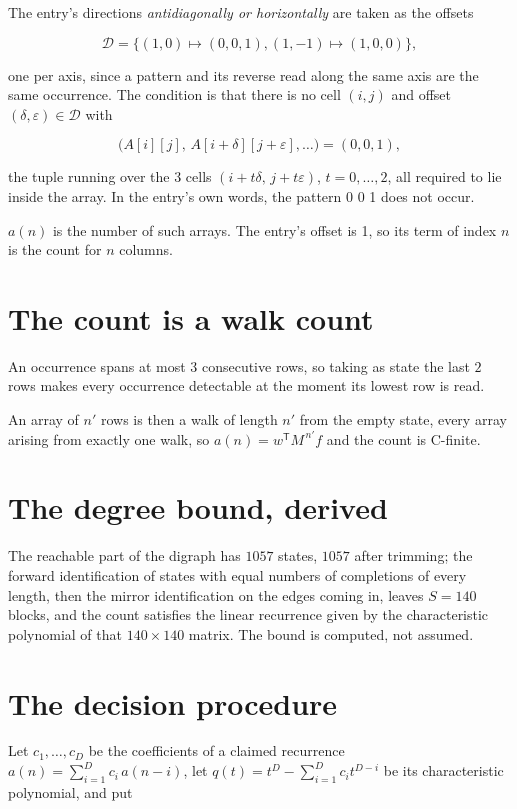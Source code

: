 \documentclass[11pt]{article}
\theoremstyle{definition}
\begin{document}
The entry's directions {\itshape antidiagonally or horizontally} are taken as the offsets

\[\mathcal{D} = \{(1,0)\mapsto(0,0,1), (1,-1)\mapsto(1,0,0)\},\]

one per axis, since a pattern and its reverse read along the same axis are the same occurrence. The condition is that there is no cell $(i,j)$ and offset $(\delta,\varepsilon)\in\mathcal{D}$ with

\[\bigl(A[i][j],\,A[i{+}\delta][j{+}\varepsilon],\dots\bigr) = (0, 0, 1),\]

the tuple running over the $3$ cells $(i+t\delta,\,j+t\varepsilon)$, $t = 0,\dots,2$, all required to lie inside the array. In the entry's own words, the pattern 0 0 1 does not occur.

$a(n)$ is the number of such arrays. The entry's offset is 1, so its term of index $n$ is the count for $n$ columns.

\section{The count is a walk count}

An occurrence spans at most $3$ consecutive rows, so taking as state the last $2$ rows makes every occurrence detectable at the moment its lowest row is read.

An array of $n'$ rows is then a walk of length $n'$ from the empty state, every array arising from exactly one walk, so $a(n) = w^{\mathsf T}M^{\,n'}f$ and the count is C-finite.

\section{The degree bound, derived}

The reachable part of the digraph has $1057$ states, $1057$ after trimming; the forward identification of states with equal numbers of completions of every length, then the mirror identification on the edges coming in, leaves $S = 140$ blocks, and the count satisfies the linear recurrence given by the characteristic polynomial of that $140\times140$ matrix. The bound is computed, not assumed.

\section{The decision procedure}

Let $c_1,\dots,c_D$ be the coefficients of a claimed recurrence $a(n) = \sum_{i=1}^{D} c_i\,a(n-i)$, let $q(t) = t^{D} - \sum_{i=1}^{D} c_i t^{D-i}$ be its characteristic polynomial, and put
\end{document}
